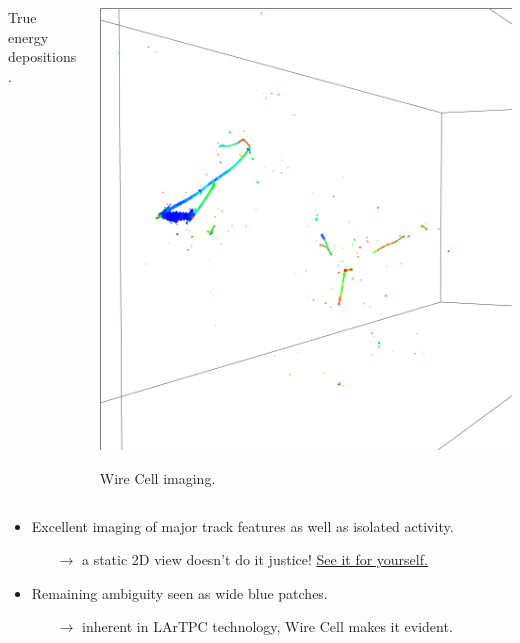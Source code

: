 \documentclass[xcolor=dvipsnames]{beamer}
\begin{document}
\begin{frame}[fragile]
\begin{columns}
\begin{column}{0.5\textwidth}
\begin{center}
        True energy depositions.
      \end{center}
    \end{column}
    \begin{column}{0.5\textwidth}
      \begin{center}
        \includegraphics[width=\textwidth,trim=0cm 10cm 0cm 0cm,clip]{payoff-reco.png}

        Wire Cell imaging.
      \end{center}
    \end{column}
  \end{columns}
  \footnotesize
  \begin{itemize}
  \item Excellent imaging of major track features as well as isolated
    activity.
    \begin{itemize}\scriptsize
    \item[$\rightarrow$] a static 2D view doesn't do it justice!  \href{http://www.phy.bnl.gov/wire-cell/bee/set/6/event/0/}{See it for yourself.}
    \end{itemize}
  \item Remaining ambiguity seen as wide blue patches.
    \begin{itemize}\scriptsize
    \item[$\rightarrow$] inherent in LArTPC technology, Wire Cell makes it evident.
    \end{itemize}
  \end{itemize}
\end{frame}
\end{document}
